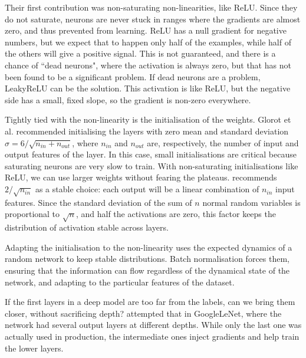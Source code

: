 Their first contribution  was non-saturating non-linearities, like ReLU.
Since they do not saturate, neurons are never stuck in ranges where the gradients are almost zero, and thus prevented from learning.
ReLU has a null gradient for negative numbers, but we expect that to happen only half of the examples, while half of the others will give a positive signal.
This is not guaranteed, and there is a chance of ``dead neurons", where the activation is always zero, but that has not been found to be a significant problem.
If dead neurons are a problem, LeakyReLU  %
can be the solution.
This activation is like ReLU, but the negative side has a small, fixed slope, so the gradient is non-zero everywhere.


Tightly tied  with the non-linearity is the initialisation of the weights.
Glorot et al. recommended initialising the layers with zero mean and standard deviation $\sigma=6/\sqrt{n_{in}+ n_{out}}$, where $n_{in}$ and $n_{out}$ are, respectively, the number of input and output features of the layer.
In this case, small initialisations are critical because saturating neurons are very slow to train.
With non-saturating initialisations like ReLU, we can use larger weights without fearing the plateaus.
\citet{he} recommends $2/\sqrt{n_{in}}$ as a stable choice: each output will be a linear combination of $n_{in}$ input features.
Since the standard deviation of the sum of $n$ normal random variables is proportional to $\sqrt{n}$, and half the activations are zero, this factor keeps the distribution of activation stable across layers.

Adapting the initialisation to the non-linearity uses the expected dynamics of a random network to keep stable distributions. 
Batch normalisation forces them, ensuring that the information can flow regardless of the dynamical state of the network, and adapting to the particular features of the dataset.

If the first layers in a deep model are too far from the labels, can we bring them closer, without sacrificing depth?  
\citet{googlenet} attempted that in GoogleLeNet, where the network had several output layers at different depths.
While only the last one was actually used in production, the intermediate ones inject gradients and help train the lower layers.

